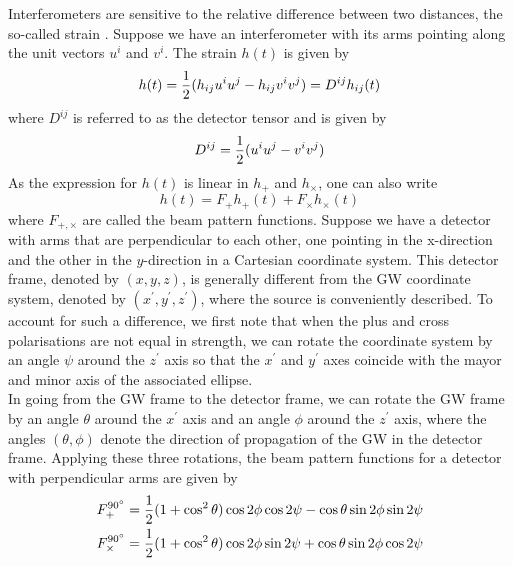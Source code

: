 \documentclass[binding=0.6cm, LaM]{sapthesis}
\begin{document}
        Interferometers are sensitive to the relative difference between two distances, the so-called strain \cite{6} .
        Suppose we have an interferometer with its arms pointing along the unit vectors $u^i$ and $v^i$. The strain $h(t)$ is given by
                \begin{equation}
                	h(t) = {1 \over 2} (h_{ij}u^iu^j - h_{ij}v^iv^j) = D^{ij}h_{ij}(t)
                \end{equation}
        where $D^{ij}$ is referred to as the detector tensor and is given by
                \begin{equation}
                	D^{ij} = {1\over 2} (u^iu^j -v^iv^j)
                \end{equation}
        As the expression for $h(t)$ is linear in $h_{+}$ and $h_{\times}$, one can also write
                \begin{equation}
		 \label{beampattern}
                	h(t) = F_{+}h_{+} (t) + F_{\times}h_{\times}(t)
                \end{equation}
        where $F_{+,\times}$ are called the beam pattern functions. Suppose we have a detector
        with arms that are perpendicular to each other, one pointing in the x-direction and the other
        in the $y$-direction in a Cartesian coordinate system. This detector frame, denoted by $(x,y,z)$,
        is generally different from the GW coordinate system, denoted by $(x^\prime,y^\prime,z^\prime)$, where the source
        is conveniently described. To account for such a difference, we first note that when the plus
        and cross polarisations are not equal in strength, we can rotate the coordinate system by
        an angle $\psi$ around the $z^\prime$ axis so that the $x^\prime$ and $y^\prime$ axes
        coincide with the mayor and minor axis of the associated ellipse. \\
        In going from the GW frame to the detector frame, we can rotate the GW frame by
        an angle $\theta$ around the $x^\prime$ axis and an angle $\phi$ around the $z^\prime$ axis,
        where the angles $(\theta, \phi)$ denote the direction of propagation of the GW in the detector frame.
        Applying these three rotations, the beam pattern functions for a detector with perpendicular arms are given by
                \begin{align}
                F_{+}^{\ang{90}}& = {1 \over 2} (1 + \cos^2 \theta)\cos 2\phi \cos 2 \psi - \cos \theta \sin2\phi \sin2\psi \\
                F_{\times}^{\ang{90}}& = {1 \over 2} (1 + \cos^2 \theta)\cos 2\phi \sin 2 \psi + \cos \theta \sin2\phi \cos2\psi
                \end{align}
\end{document}
